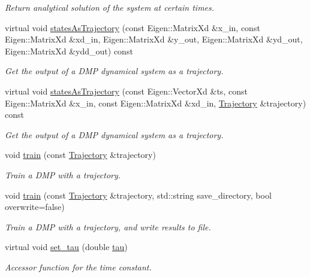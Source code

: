 \begin{DoxyCompactItemize}
\begin{DoxyCompactList}\small\item\em Return analytical solution of the system at certain times. \end{DoxyCompactList}\item 
virtual void \hyperlink{classDmpBbo_1_1Dmp_aa3ad2fc66e8ce09cfa68032a4a5004b9}{states\+As\+Trajectory} (const Eigen\+::\+Matrix\+Xd \&x\+\_\+in, const Eigen\+::\+Matrix\+Xd \&xd\+\_\+in, Eigen\+::\+Matrix\+Xd \&y\+\_\+out, Eigen\+::\+Matrix\+Xd \&yd\+\_\+out, Eigen\+::\+Matrix\+Xd \&ydd\+\_\+out) const 
\begin{DoxyCompactList}\small\item\em Get the output of a D\+M\+P dynamical system as a trajectory. \end{DoxyCompactList}\item 
virtual void \hyperlink{classDmpBbo_1_1Dmp_a0a477ccb2da97d3b6f5255a147a0e07c}{states\+As\+Trajectory} (const Eigen\+::\+Vector\+Xd \&ts, const Eigen\+::\+Matrix\+Xd \&x\+\_\+in, const Eigen\+::\+Matrix\+Xd \&xd\+\_\+in, \hyperlink{classDmpBbo_1_1Trajectory}{Trajectory} \&trajectory) const 
\begin{DoxyCompactList}\small\item\em Get the output of a D\+M\+P dynamical system as a trajectory. \end{DoxyCompactList}\item 
void \hyperlink{classDmpBbo_1_1Dmp_a5d14dedc6736ec5675b4026437b8a597}{train} (const \hyperlink{classDmpBbo_1_1Trajectory}{Trajectory} \&trajectory)
\begin{DoxyCompactList}\small\item\em Train a D\+M\+P with a trajectory. \end{DoxyCompactList}\item 
void \hyperlink{classDmpBbo_1_1Dmp_abca46c9155c3cfbc71d10aabdcf3384c}{train} (const \hyperlink{classDmpBbo_1_1Trajectory}{Trajectory} \&trajectory, std\+::string save\+\_\+directory, bool overwrite=false)
\begin{DoxyCompactList}\small\item\em Train a D\+M\+P with a trajectory, and write results to file. \end{DoxyCompactList}\item 
virtual void \hyperlink{classDmpBbo_1_1Dmp_a17edb45ef62a4ef7f8c78e4f8f68b249}{set\+\_\+tau} (double \hyperlink{group__DynamicalSystems_ga50eec7ad4c9664b5809ace45b22200d5}{tau})
\begin{DoxyCompactList}\small\item\em Accessor function for the time constant. \end{DoxyCompactList}\item 

\end{DoxyCompactItemize}
